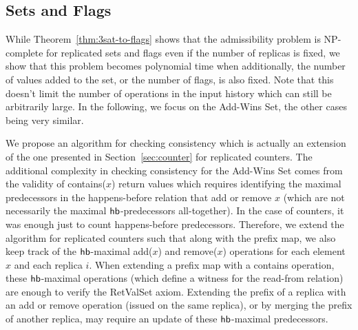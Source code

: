 
\subsection{Sets and Flags}
\label{sec:ptime:sets}

While Theorem~\ref{thm:3sat-to-flags} shows that the admissibility problem is NP-complete for replicated sets and flags even if the number of replicas is fixed, we show that this problem becomes polynomial time when additionally, the number of values added to the set, or the number of flags, is also fixed. Note that this doesn't limit the number of operations in the input history which can still be arbitrarily large. In the following, we focus on the Add-Wins Set, the other cases being very similar.

We propose an algorithm for checking consistency which is actually an extension of the one presented in Section~\ref{sec:counter} for replicated counters.
The additional complexity in checking consistency for the Add-Wins Set comes from the validity of {\sf contains}($x$) return values which requires identifying the maximal predecessors in the happens-before relation that add or remove $x$ (which are not necessarily the maximal $\textsf{hb}$-predecessors all-together). In the case of counters, it was enough just to count happens-before predecessors.
Therefore, we extend the algorithm for replicated counters such that along with the prefix map, we also keep track of the $\textsf{hb}$-maximal {\sf add}($x$) and {\sf remove}($x$) operations for each element $x$ and each replica $i$.
When extending a prefix map with a {\sf contains} operation, these $\textsf{hb}$-maximal operations (which define a witness for the read-from relation) are enough to verify the {\sc RetValSet} axiom. Extending the prefix of a replica with an {\sf add} or {\sf remove} operation (issued on the same replica), or by merging the prefix of another replica, may require an update of these $\textsf{hb}$-maximal predecessors.

